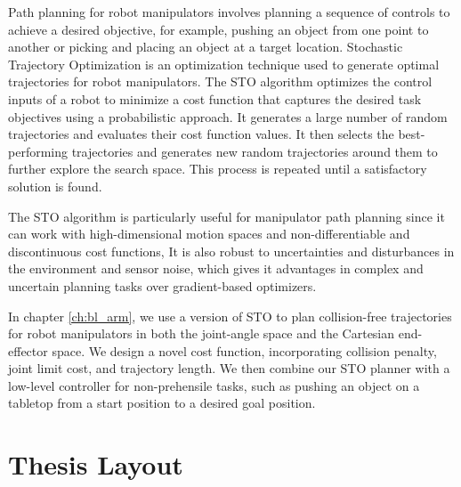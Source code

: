 Path planning for robot manipulators involves planning a sequence of controls to achieve a desired objective, for example, pushing an object from one point to another or picking and placing an object at a target location. Stochastic Trajectory Optimization is an optimization technique used to generate optimal trajectories for robot manipulators. The STO algorithm optimizes the control inputs of a robot to minimize a cost function that captures the desired task objectives using a probabilistic approach.
It generates a large number of random trajectories and evaluates their cost function values. It then selects the best-performing trajectories and generates new random trajectories around them to further explore the search space. This process is repeated until a satisfactory solution is found.

The STO algorithm is particularly useful for manipulator path planning since it can work with high-dimensional motion spaces and non-differentiable and discontinuous cost functions, It is also robust to uncertainties and disturbances in the environment and sensor noise, which gives it advantages in complex and uncertain planning tasks over gradient-based optimizers. 

In chapter \ref{ch:bl_arm}, we use a version of STO to plan collision-free trajectories for robot manipulators in both the joint-angle space and the Cartesian end-effector space. We design a novel cost function, incorporating collision penalty, joint limit cost, and trajectory length. We then combine our STO planner with a low-level controller for non-prehensile tasks, such as pushing an object on a tabletop from a start position to a desired goal position. 



\section{Thesis Layout}

